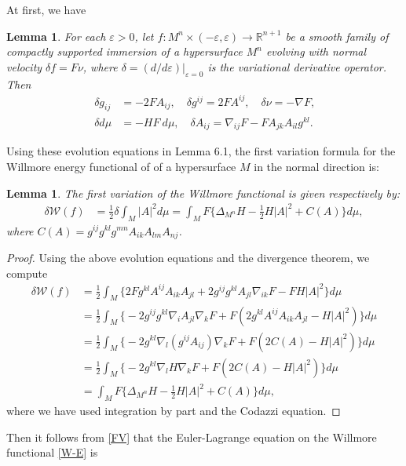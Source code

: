 \documentclass{amsart}
\newtheorem{lemma}[theorem]{Lemma}
\theoremstyle{definition}
\numberwithin{equation}{section}
\begin{document}
 At first, we have
\begin{lemma}
For  each $\varepsilon>0$, let $f: M^n\times(-\varepsilon, \varepsilon)\rightarrow \mathbb R^{n+1}$ be a smooth family of compactly
supported immersion of a hypersurface $M^n$ evolving with normal velocity $\delta f = F\nu$, where $\delta=(d/d \varepsilon)|_{ \varepsilon=0}$ is the variational derivative operator. Then
\begin{align*}
\delta g_{ij} &= -2F A_{ij},\quad
\delta g^{ij}  = 2F A^{ij},\quad
\delta \nu  =-\nabla F \mbox{,}\\
\delta d \mu &= -HF~d\mu ,\quad
\delta A_{ij} = \nabla_{ij}F-F A_{jk}A_{il}g^{kl} \mbox{.}
\end{align*}
\end{lemma}


Using these evolution equations  in Lemma 6.1, the first variation formula for the Willmore energy
 functional of of a hypersurface $M$ in the normal direction is:
\begin{lemma}\label {6.2}
	The first variation  of the Willmore functional is given respectively by:
	\begin{align} \label{FV}
	\delta{\mathcal W(f)}&=\frac 12\delta\int_{M} |A|^2 d\mu  =\int_{M} F\Big\{\Delta_{M^n} H-\frac 12H|A|^2+ C(A)\Big\} d\mu,
	\end{align}
	where $C(A)=g^{ij}g^{kl}g^{mn}A_{ik}A_{lm}A_{nj}$.
\end{lemma}
\begin{proof}
	Using the above evolution equations and the divergence
	theorem, we compute
	\begin{align}
	\delta{\mathcal W(f)}
	&=\frac 12\int_{M} \Big\{2Fg^{kl}A^{ij}A_{ik}A_{jl}+2g^{ij}g^{kl}A_{jl}\nabla_{ik}F-FH|A|^2\Big\} d\mu \nonumber\\
	&=\frac 12\int_{M} \Big\{-2g^{ij}g^{kl}\nabla_iA_{jl}\nabla_{k}F +F(2g^{kl}A^{ij}A_{ik}A_{jl}-H|A|^2)\Big\} d\mu\nonumber\\
	&=\frac 12\int_{M} \Big\{-2g^{kl}\nabla_l(g^{ij}A_{ij})\nabla_{k}F +F(2C(A)-H|A|^2)\Big\} d\mu\nonumber\\
	&=\frac 12\int_{M} \Big\{-2g^{kl}\nabla_lH\nabla_{k}F +F(2C(A)-H|A|^2)\Big\} d\mu\nonumber\\
	&= \int_{M} F\Big\{\Delta_{M^n} H-\frac 12 H|A|^2+C(A)\Big\} d\mu,\nonumber
	\end{align}
	where we have used integration by part and the Codazzi equation.
	\end{proof}
Then it follows from \eqref{FV} that the Euler-Lagrange equation on the Willmore functional \eqref{W-E} is
\end{document}

